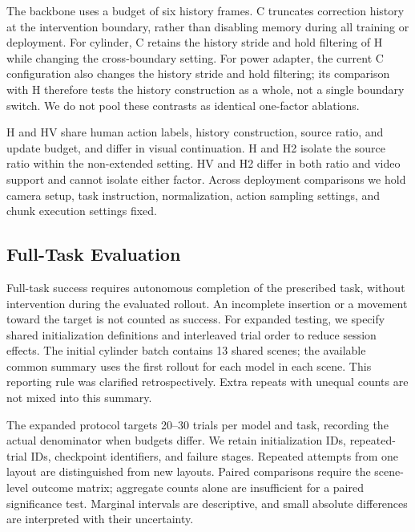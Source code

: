 \documentclass[letterpaper,10pt,conference]{ieeeconf}
\begin{document}
The backbone uses a budget of six history frames. C truncates correction history at the intervention boundary, rather than disabling memory during all training or deployment. For cylinder, C retains the history stride and hold filtering of H while changing the cross-boundary setting. For power adapter, the current C configuration also changes the history stride and hold filtering; its comparison with H therefore tests the history construction as a whole, not a single boundary switch. We do not pool these contrasts as identical one-factor ablations.

H and HV share human action labels, history construction, source ratio, and update budget, and differ in visual continuation. H and H2 isolate the source ratio within the non-extended setting. HV and H2 differ in both ratio and video support and cannot isolate either factor. Across deployment comparisons we hold camera setup, task instruction, normalization, action sampling settings, and chunk execution settings fixed.

\subsection{Full-Task Evaluation}
Full-task success requires autonomous completion of the prescribed task, without intervention during the evaluated rollout. An incomplete insertion or a movement toward the target is not counted as success. For expanded testing, we specify shared initialization definitions and interleaved trial order to reduce session effects. The initial cylinder batch contains 13 shared scenes; the available common summary uses the first rollout for each model in each scene. This reporting rule was clarified retrospectively. Extra repeats with unequal counts are not mixed into this summary.

The expanded protocol targets 20--30 trials per model and task, recording the actual denominator when budgets differ. We retain initialization IDs, repeated-trial IDs, checkpoint identifiers, and failure stages. Repeated attempts from one layout are distinguished from new layouts. Paired comparisons require the scene-level outcome matrix; aggregate counts alone are insufficient for a paired significance test. Marginal intervals are descriptive, and small absolute differences are interpreted with their uncertainty.
\end{document}

